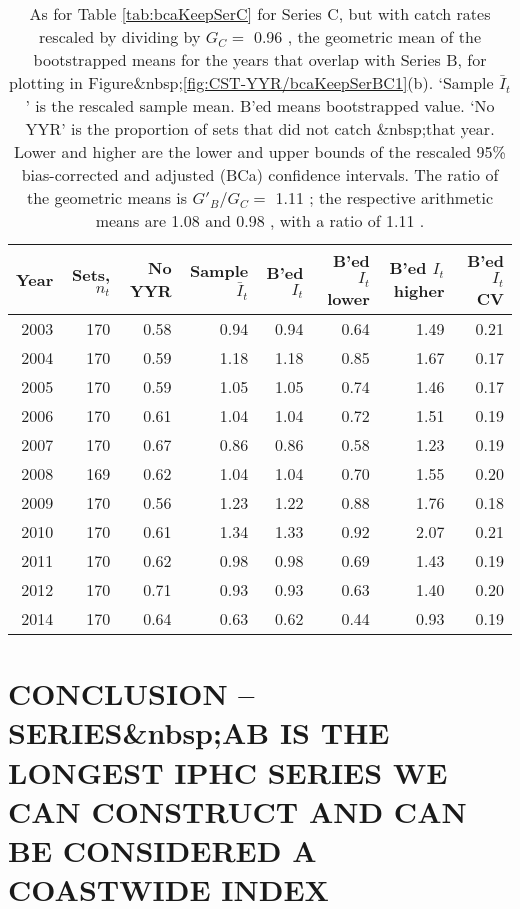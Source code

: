 \begin{table}[tp]
\centering
\caption{As for Table \ref{tab:bcaKeepSerC} for Series C, 
     but with catch rates rescaled by dividing
     by $G_{C}=$ 0.96 , 
     the geometric mean of the bootstrapped means for the years that overlap
     with Series B, for plotting in Figure&nbsp;\ref{fig:CST-YYR/bcaKeepSerBC1}(b).
     `Sample $\bar{I}_t$' is the rescaled sample mean. B'ed means bootstrapped 
     value. `No YYR' is the proportion of sets that did not catch \spName&nbsp;that
     year. Lower and higher are the 
     lower and upper bounds of the rescaled 
     95\% bias-corrected and adjusted (BCa)
     confidence intervals. The ratio of the geometric means is $G'_{B}/G_{C}=$ 1.11 ; the respective arithmetic means are  1.08  and 
      0.98 , with a ratio of  1.11 .} 
\label{tab:serCscaled}
\begin{tabular}{rrrrrrrr}
  \hline
Year & Sets, $n_t$ & No YYR & Sample $\bar{I}_t$ & B'ed $I_t$ & B'ed $I_t$ lower & B'ed $I_t$ higher & B'ed $I_t$ CV \\ 
  \hline
2003 & 170 & 0.58 & 0.94 & 0.94 & 0.64 & 1.49 & 0.21 \\ 
  2004 & 170 & 0.59 & 1.18 & 1.18 & 0.85 & 1.67 & 0.17 \\ 
  2005 & 170 & 0.59 & 1.05 & 1.05 & 0.74 & 1.46 & 0.17 \\ 
  2006 & 170 & 0.61 & 1.04 & 1.04 & 0.72 & 1.51 & 0.19 \\ 
  2007 & 170 & 0.67 & 0.86 & 0.86 & 0.58 & 1.23 & 0.19 \\ 
  2008 & 169 & 0.62 & 1.04 & 1.04 & 0.70 & 1.55 & 0.20 \\ 
  2009 & 170 & 0.56 & 1.23 & 1.22 & 0.88 & 1.76 & 0.18 \\ 
  2010 & 170 & 0.61 & 1.34 & 1.33 & 0.92 & 2.07 & 0.21 \\ 
  2011 & 170 & 0.62 & 0.98 & 0.98 & 0.69 & 1.43 & 0.19 \\ 
  2012 & 170 & 0.71 & 0.93 & 0.93 & 0.63 & 1.40 & 0.20 \\ 
  2014 & 170 & 0.64 & 0.63 & 0.62 & 0.44 & 0.93 & 0.19 \\ 
   \hline
\end{tabular}
\end{table}


\clearpage

\section{CONCLUSION -- SERIES&nbsp;AB IS THE LONGEST IPHC SERIES WE CAN CONSTRUCT AND CAN BE CONSIDERED A COASTWIDE INDEX}

